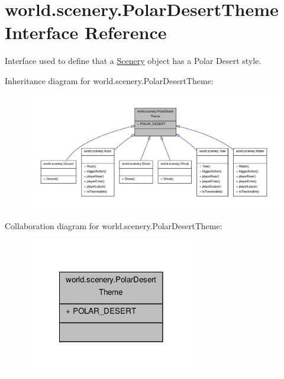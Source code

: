\hypertarget{interfaceworld_1_1scenery_1_1_polar_desert_theme}{\section{world.\-scenery.\-Polar\-Desert\-Theme Interface Reference}
\label{interfaceworld_1_1scenery_1_1_polar_desert_theme}
}


Interface used to define that a \hyperlink{classworld_1_1scenery_1_1_scenery}{Scenery} object has a Polar Desert style.  




Inheritance diagram for world.\-scenery.\-Polar\-Desert\-Theme\-:
\nopagebreak
\begin{figure}[H]
\begin{center}
\leavevmode
\includegraphics[width=350pt]{interfaceworld_1_1scenery_1_1_polar_desert_theme__inherit__graph}
\end{center}
\end{figure}


Collaboration diagram for world.\-scenery.\-Polar\-Desert\-Theme\-:
\nopagebreak
\begin{figure}[H]
\begin{center}
\leavevmode
\includegraphics[width=210pt]{interfaceworld_1_1scenery_1_1_polar_desert_theme__coll__graph}
\end{center}
\end{figure}
